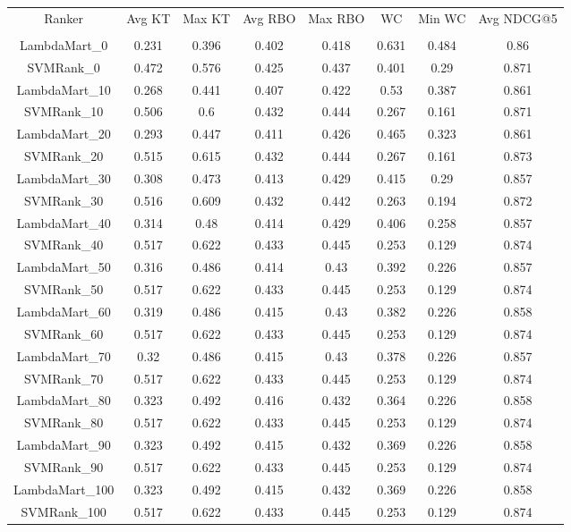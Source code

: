 \begin{longtable}{*{8}{c}}
Ranker & Avg KT & Max KT & Avg RBO & Max RBO & WC & Min WC & Avg NDCG@5\\\\ 
LambdaMart_0 & 0.231 & 0.396 & 0.402 & 0.418 & 0.631 & 0.484 & 0.86 \\ 
SVMRank_0 & 0.472 & 0.576 & 0.425 & 0.437 & 0.401 & 0.29 & 0.871 \\ 
LambdaMart_10 & 0.268 & 0.441 & 0.407 & 0.422 & 0.53 & 0.387 & 0.861 \\ 
SVMRank_10 & 0.506 & 0.6 & 0.432 & 0.444 & 0.267 & 0.161 & 0.871 \\ 
LambdaMart_20 & 0.293 & 0.447 & 0.411 & 0.426 & 0.465 & 0.323 & 0.861 \\ 
SVMRank_20 & 0.515 & 0.615 & 0.432 & 0.444 & 0.267 & 0.161 & 0.873 \\ 
LambdaMart_30 & 0.308 & 0.473 & 0.413 & 0.429 & 0.415 & 0.29 & 0.857 \\ 
SVMRank_30 & 0.516 & 0.609 & 0.432 & 0.442 & 0.263 & 0.194 & 0.872 \\ 
LambdaMart_40 & 0.314 & 0.48 & 0.414 & 0.429 & 0.406 & 0.258 & 0.857 \\ 
SVMRank_40 & 0.517 & 0.622 & 0.433 & 0.445 & 0.253 & 0.129 & 0.874 \\ 
LambdaMart_50 & 0.316 & 0.486 & 0.414 & 0.43 & 0.392 & 0.226 & 0.857 \\ 
SVMRank_50 & 0.517 & 0.622 & 0.433 & 0.445 & 0.253 & 0.129 & 0.874 \\ 
LambdaMart_60 & 0.319 & 0.486 & 0.415 & 0.43 & 0.382 & 0.226 & 0.858 \\ 
SVMRank_60 & 0.517 & 0.622 & 0.433 & 0.445 & 0.253 & 0.129 & 0.874 \\ 
LambdaMart_70 & 0.32 & 0.486 & 0.415 & 0.43 & 0.378 & 0.226 & 0.857 \\ 
SVMRank_70 & 0.517 & 0.622 & 0.433 & 0.445 & 0.253 & 0.129 & 0.874 \\ 
LambdaMart_80 & 0.323 & 0.492 & 0.416 & 0.432 & 0.364 & 0.226 & 0.858 \\ 
SVMRank_80 & 0.517 & 0.622 & 0.433 & 0.445 & 0.253 & 0.129 & 0.874 \\ 
LambdaMart_90 & 0.323 & 0.492 & 0.415 & 0.432 & 0.369 & 0.226 & 0.858 \\ 
SVMRank_90 & 0.517 & 0.622 & 0.433 & 0.445 & 0.253 & 0.129 & 0.874 \\ 
LambdaMart_100 & 0.323 & 0.492 & 0.415 & 0.432 & 0.369 & 0.226 & 0.858 \\ 
SVMRank_100 & 0.517 & 0.622 & 0.433 & 0.445 & 0.253 & 0.129 & 0.874 \\ 
\end{longtable}